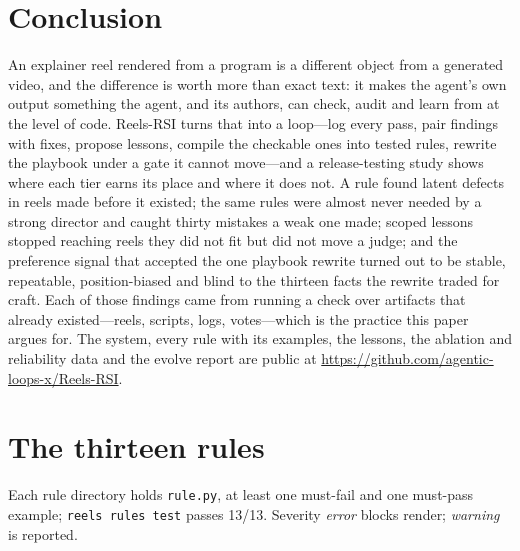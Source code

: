\documentclass[11pt]{article}
\newcommand{\sys}{Reels-RSI}
\begin{document}
\section{Conclusion}
An explainer reel rendered from a program is a different object from a generated video, and the
difference is worth more than exact text: it makes the agent's own output something the agent, and
its authors, can check, audit and learn from at the level of code. \sys{} turns that into a
loop---log every pass, pair findings with fixes, propose lessons, compile the checkable ones into
tested rules, rewrite the playbook under a gate it cannot move---and a release-testing study shows
where each tier earns its place and where it does not. A rule found latent defects in reels made
before it existed; the same rules were almost never needed by a strong director and caught thirty mistakes a weak one
made;
scoped lessons stopped reaching reels they did not fit but did not move a judge; and the preference
signal that accepted the one playbook rewrite turned out to be stable, repeatable, position-biased
and blind to the thirteen facts the rewrite traded for craft. Each of those findings came from
running a check over artifacts that already existed---reels, scripts, logs, votes---which is the
practice this paper argues for. The system, every rule with its examples, the lessons, the ablation
and reliability data and the evolve report are public at
\url{https://github.com/agentic-loops-x/Reels-RSI}.




\appendix
\section{The thirteen rules}
\label{app:rules}
Each rule directory holds \texttt{rule.py}, at least one must-fail and one must-pass example;
\texttt{reels rules test} passes 13/13. Severity \emph{error} blocks render; \emph{warning} is
reported.
\end{document}
